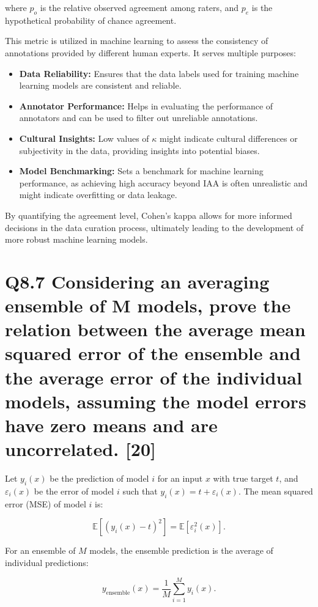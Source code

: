 \documentclass[11pt]{article}
\begin{document}
where \( p_o \) is the relative observed agreement among raters, and \( p_e \) is the hypothetical probability of chance agreement. 

This metric is utilized in machine learning to assess the consistency of annotations provided by different human experts. It serves multiple purposes:

\begin{itemize}
  \item \textbf{Data Reliability:} Ensures that the data labels used for training machine learning models are consistent and reliable.
  \item \textbf{Annotator Performance:} Helps in evaluating the performance of annotators and can be used to filter out unreliable annotations.
  \item \textbf{Cultural Insights:} Low values of \(\kappa\) might indicate cultural differences or subjectivity in the data, providing insights into potential biases.
  \item \textbf{Model Benchmarking:} Sets a benchmark for machine learning performance, as achieving high accuracy beyond IAA is often unrealistic and might indicate overfitting or data leakage.
\end{itemize}

By quantifying the agreement level, Cohen's kappa allows for more informed decisions in the data curation process, ultimately leading to the development of more robust machine learning models.

\section{Q8.7 Considering an averaging ensemble of M models, prove the relation between the average mean squared error of the ensemble and the average error of the individual models, assuming the model errors have zero means and are uncorrelated. [20]}

Let \( y_i(x) \) be the prediction of model \( i \) for an input \( x \) with true target \( t \), and \( \varepsilon_i(x) \) be the error of model \( i \) such that \( y_i(x) = t + \varepsilon_i(x) \). The mean squared error (MSE) of model \( i \) is:

\[
\mathbb{E}\left[\left(y_i(x) - t\right)^2\right] = \mathbb{E}\left[\varepsilon_i^2(x)\right].
\]

For an ensemble of \( M \) models, the ensemble prediction is the average of individual predictions:

\[
y_{\text{ensemble}}(x) = \frac{1}{M} \sum_{i=1}^{M} y_i(x).
\]
\end{document}

